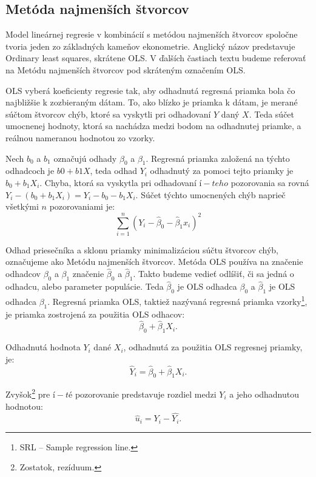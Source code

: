 \documentclass[]{tukediphc}
\begin{document}
\subsection{Metóda najmenších štvorcov}

Model lineárnej regresie v kombinácií s metódou najmenších štvorcov spoločne tvoria jeden zo základných kameňov ekonometrie. Anglický názov predstavuje Ordinary least squares, skrátene OLS. V ďalších častiach textu budeme referovať na Metódu najmenších štvorcov pod skráteným označením OLS.

OLS vyberá koeficienty regresie tak, aby odhadnutá regresná priamka bola čo najbližšie k zozbieraným dátam. To, ako blízko je priamka k dátam, je merané súčtom štvorcov chýb, ktoré sa vyskytli pri odhadovaní $Y$ daný $X$. Teda súčet umocnenej hodnoty, ktorá sa nachádza medzi bodom na odhadnutej priamke, a reálnou nameranou hodnotou zo vzorky.  

Nech $b_0$ a $b_1$ označujú odhady $\beta_0$ a $\beta_1$. Regresná priamka založená na týchto odhadcoch je $b0 + b1X$, teda odhad $Y_i$ odhadnutý za pomoci tejto priamky je $b_0 + b_1X_i$. Chyba, ktorá sa vyskytla pri odhadovaní $í-teho$ pozorovania sa rovná $Y_i - (b_0 + b_1X_i) = Y_i - b_0 - b_1X_i$. Súčet týchto umocnených chýb naprieč všetkými $n$ pozorovaniami je:
\begin{equation}
   \sum_{i=1}^{n}(Y_i - \hat\beta_0 - \hat\beta_1{x}_i)^2 
\end{equation}

Odhad priesečníka a sklonu priamky minimalizáciou súčtu štvorcov chýb, označujeme ako Metódu najmenších štvorcov. Metóda OLS používa na značenie odhadcov $\beta_0$ a $\beta_1$ značenie $\hat\beta_0$ a $\hat\beta_1$. Takto budeme vedieť odlíšiť, či sa jedná o odhadcu, alebo parameter populácie. Teda $\hat\beta_0$ je OLS odhadca $\beta_0$ a $\hat\beta_1$ je OLS odhadca $\beta_1$. Regresná priamka OLS, taktiež nazývaná regresná priamka vzorky\footnote{SRL – Sample regression line.}, je priamka zostrojená za použitia OLS odhacov: 
\begin{equation}
   \hat\beta_0 + \hat\beta_{1}X_i.  
\end{equation}

Odhadnutá hodnota $Y_i$ dané $X_i$, odhadnutá za použitia OLS regresnej priamky, je: 
\begin{equation}
  \hat{Y}_{i} = \hat\beta_0 + \hat\beta_{1}X_i.  
\end{equation}
 
Zvyšok\footnote{Zostatok, rezíduum.} pre $í-té$ pozorovanie predstavuje rozdiel medzi $Y_i$ a jeho odhadnutou hodnotou: 
\begin{equation}
    \hat{u}_i = Y_i - \hat{Y_i}.
\end{equation}
\end{document}
